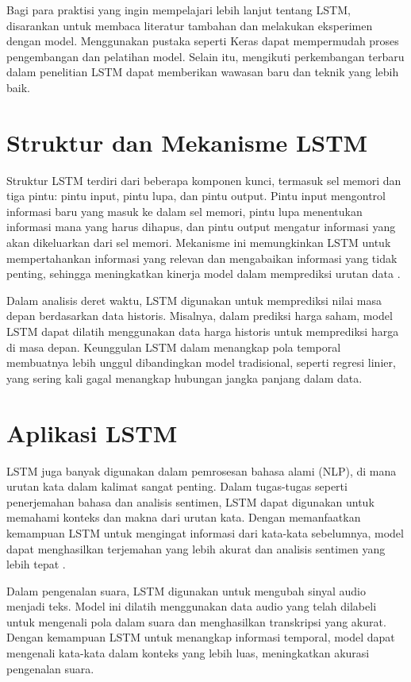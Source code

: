 \par Bagi para praktisi yang ingin mempelajari lebih lanjut tentang LSTM, disarankan untuk membaca literatur tambahan dan melakukan eksperimen dengan model. Menggunakan pustaka seperti Keras dapat mempermudah proses pengembangan dan pelatihan model. Selain itu, mengikuti perkembangan terbaru dalam penelitian LSTM dapat memberikan wawasan baru dan teknik yang lebih baik.

\section{Struktur dan Mekanisme LSTM}
\par Struktur LSTM terdiri dari beberapa komponen kunci, termasuk sel memori dan tiga pintu: pintu input, pintu lupa, dan pintu output. Pintu input mengontrol informasi baru yang masuk ke dalam sel memori, pintu lupa menentukan informasi mana yang harus dihapus, dan pintu output mengatur informasi yang akan dikeluarkan dari sel memori. Mekanisme ini memungkinkan LSTM untuk mempertahankan informasi yang relevan dan mengabaikan informasi yang tidak penting, sehingga meningkatkan kinerja model dalam memprediksi urutan data \citep{graves2013}.

\par Dalam analisis deret waktu, LSTM digunakan untuk memprediksi nilai masa depan berdasarkan data historis. Misalnya, dalam prediksi harga saham, model LSTM dapat dilatih menggunakan data harga historis untuk memprediksi harga di masa depan. Keunggulan LSTM dalam menangkap pola temporal membuatnya lebih unggul dibandingkan model tradisional, seperti regresi linier, yang sering kali gagal menangkap hubungan jangka panjang dalam data.

\section{Aplikasi LSTM}
\par LSTM juga banyak digunakan dalam pemrosesan bahasa alami (NLP), di mana urutan kata dalam kalimat sangat penting. Dalam tugas-tugas seperti penerjemahan bahasa dan analisis sentimen, LSTM dapat digunakan untuk memahami konteks dan makna dari urutan kata. Dengan memanfaatkan kemampuan LSTM untuk mengingat informasi dari kata-kata sebelumnya, model dapat menghasilkan terjemahan yang lebih akurat dan analisis sentimen yang lebih tepat \citep{zhang2019}.

\par Dalam pengenalan suara, LSTM digunakan untuk mengubah sinyal audio menjadi teks. Model ini dilatih menggunakan data audio yang telah dilabeli untuk mengenali pola dalam suara dan menghasilkan transkripsi yang akurat. Dengan kemampuan LSTM untuk menangkap informasi temporal, model dapat mengenali kata-kata dalam konteks yang lebih luas, meningkatkan akurasi pengenalan suara.


